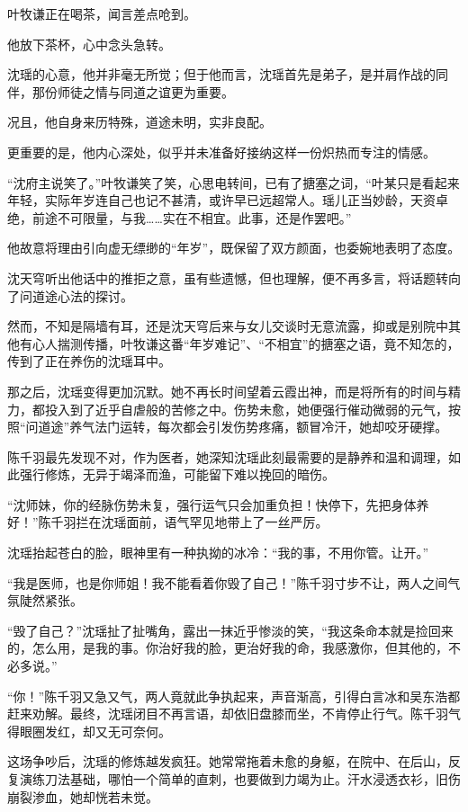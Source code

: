 叶牧谦正在喝茶，闻言差点呛到。

他放下茶杯，心中念头急转。

沈瑶的心意，他并非毫无所觉；但于他而言，沈瑶首先是弟子，是并肩作战的同伴，那份师徒之情与同道之谊更为重要。

况且，他自身来历特殊，道途未明，实非良配。

更重要的是，他内心深处，似乎并未准备好接纳这样一份炽热而专注的情感。

“沈府主说笑了。”叶牧谦笑了笑，心思电转间，已有了搪塞之词，“叶某只是看起来年轻，实际年岁连自己也记不甚清，或许早已远超常人。瑶儿正当妙龄，天资卓绝，前途不可限量，与我……实在不相宜。此事，还是作罢吧。”

他故意将理由引向虚无缥缈的“年岁”，既保留了双方颜面，也委婉地表明了态度。

沈天穹听出他话中的推拒之意，虽有些遗憾，但也理解，便不再多言，将话题转向了问道途心法的探讨。

然而，不知是隔墙有耳，还是沈天穹后来与女儿交谈时无意流露，抑或是别院中其他有心人揣测传播，叶牧谦这番“年岁难记”、“不相宜”的搪塞之语，竟不知怎的，传到了正在养伤的沈瑶耳中。

那之后，沈瑶变得更加沉默。她不再长时间望着云霞出神，而是将所有的时间与精力，都投入到了近乎自虐般的苦修之中。伤势未愈，她便强行催动微弱的元气，按照“问道途”养气法门运转，每次都会引发伤势疼痛，额冒冷汗，她却咬牙硬撑。

陈千羽最先发现不对，作为医者，她深知沈瑶此刻最需要的是静养和温和调理，如此强行修炼，无异于竭泽而渔，可能留下难以挽回的暗伤。

“沈师妹，你的经脉伤势未复，强行运气只会加重负担！快停下，先把身体养好！”陈千羽拦在沈瑶面前，语气罕见地带上了一丝严厉。

沈瑶抬起苍白的脸，眼神里有一种执拗的冰冷：“我的事，不用你管。让开。”

“我是医师，也是你师姐！我不能看着你毁了自己！”陈千羽寸步不让，两人之间气氛陡然紧张。

“毁了自己？”沈瑶扯了扯嘴角，露出一抹近乎惨淡的笑，“我这条命本就是捡回来的，怎么用，是我的事。你治好我的脸，更治好我的命，我感激你，但其他的，不必多说。”

“你！”陈千羽又急又气，两人竟就此争执起来，声音渐高，引得白言冰和吴东浩都赶来劝解。最终，沈瑶闭目不再言语，却依旧盘膝而坐，不肯停止行气。陈千羽气得眼圈发红，却又无可奈何。

这场争吵后，沈瑶的修炼越发疯狂。她常常拖着未愈的身躯，在院中、在后山，反复演练刀法基础，哪怕一个简单的直刺，也要做到力竭为止。汗水浸透衣衫，旧伤崩裂渗血，她却恍若未觉。

